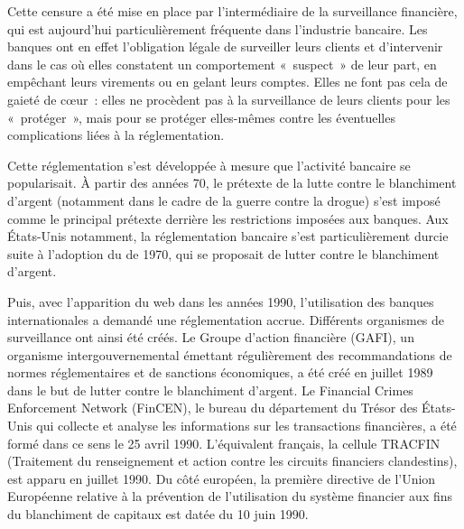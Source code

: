 Cette censure a été mise en place par l'intermédiaire de la surveillance financière, qui est aujourd'hui particulièrement fréquente dans l'industrie bancaire. Les banques ont en effet l'obligation légale de surveiller leurs clients et d'intervenir dans le cas où elles constatent un comportement «~suspect~» de leur part, en empêchant leurs virements ou en gelant leurs comptes. Elles ne font pas cela de gaieté de cœur~: elles ne procèdent pas à la surveillance de leurs clients pour les «~protéger~», mais pour se protéger elles-mêmes contre les éventuelles complications liées à la réglementation.

Cette réglementation s'est développée à mesure que l'activité bancaire se popularisait. À partir des années 70, le prétexte de la lutte contre le blanchiment d'argent (notamment dans le cadre de la guerre contre la drogue) s'est imposé comme le principal prétexte derrière les restrictions imposées aux banques. Aux États-Unis notamment, la réglementation bancaire s'est particulièrement durcie suite à l'adoption du  de 1970, qui se proposait de lutter contre le blanchiment d'argent.

Puis, avec l'apparition du web dans les années 1990, l'utilisation des banques internationales a demandé une réglementation accrue. Différents organismes de surveillance ont ainsi été créés. Le Groupe d'action financière (GAFI), un organisme intergouvernemental émettant régulièrement des recommandations de normes réglementaires et de sanctions économiques, a été créé en juillet 1989 dans le but de lutter contre le blanchiment d'argent. Le Financial Crimes Enforcement Network (FinCEN), le bureau du département du Trésor des États-Unis qui collecte et analyse les informations sur les transactions financières, a été formé dans ce sens le 25 avril 1990. L'équivalent français, la cellule TRACFIN (Traitement du renseignement et action contre les circuits financiers clandestins), est apparu en juillet 1990. Du côté européen, la première directive de l'Union Européenne relative à la prévention de l'utilisation du système financier aux fins du blanchiment de capitaux est datée du 10 juin 1990.

